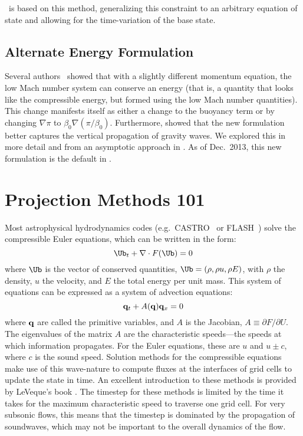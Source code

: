 \maestro\ is based on this method, generalizing this constraint to an
arbitrary equation of state and allowing for the time-variation of the
base state.

\subsection{Alternate Energy Formulation}

Several authors~\cite{KP:2012,VLBWZ:2013} showed that with a slightly
different momentum equation, the low Mach number system can conserve
an energy (that is, a quantity that looks like the compressible
energy, but formed using the low Mach number quantities).  This change
manifests itself as either a change to the buoyancy term or by
changing $\nabla \pi$ to $\beta_0 \nabla (\pi/\beta_0)$.  Furthermore,
\cite{VLBWZ:2013} showed that the new formulation better captures the
vertical propagation of gravity waves.  We explored this in more
detail and from an asymptotic approach in \cite{MaestroEnergy}.  As of
Dec.\ 2013, this new formulation is the default in \maestro.

\section{Projection Methods 101}

Most astrophysical hydrodynamics codes
(e.g.\ CASTRO~\cite{castro} or FLASH~\cite{flash}) solve the
compressible Euler equations, which can be written in the form:
\begin{equation}
\Ub_t + \nabla \cdot F(\Ub) = 0
\end{equation}
where $\Ub$ is the vector of conserved quantities, $\Ub = (\rho, \rho u,
\rho E)$, with $\rho$ the density, $u$ the velocity, and $E$ the total
energy per unit mass.  This system of equations can be expressed 
as a system of advection equations:
\begin{equation}
{\bf q}_t + A({\bf q}) {\bf q}_x = 0
\end{equation}
where ${\bf q}$ are called the primitive variables, and $A$ is the
Jacobian, $A \equiv \partial F / \partial U$.  The eigenvalues of the
matrix $A$ are the characteristic speeds---the speeds at which
information propagates.  For the Euler equations, these are $u$ and $u
\pm c$, where $c$ is the sound speed.  Solution methods for the
compressible equations make use of this wave-nature to compute fluxes
at the interfaces of grid cells to update the state in time.  An
excellent introduction to these methods is provided by LeVeque's book
\cite{leveque}.  The timestep for these methods is limited by the time
it takes for the maximum characteristic speed to traverse one grid cell.
For very subsonic flows, this means that the timestep is dominated by
the propagation of soundwaves, which may not be important to the
overall dynamics of the flow.


